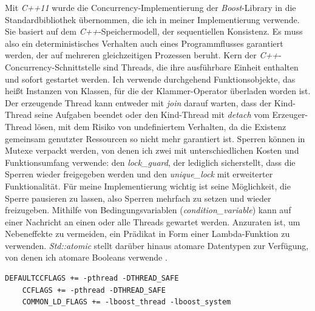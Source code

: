\documentclass[a4paper,12pt,twoside]{article}
\newcommand{\Fb}[1]{\textit{#1}} %
\begin{document}
Mit \Fb{C++11} wurde die Concurrency-Implementierung der \Fb{Boost}-Library in die Standardbibliothek übernommen, die ich in meiner Implementierung verwende. Sie basiert auf dem \Fb{C++}-Speichermodell, der sequentiellen Konsistenz. Es muss also ein deterministisches Verhalten auch eines Programmflusses garantiert werden, der auf mehreren gleichzeitigen Prozessen beruht. Kern der \Fb{C++}-Concurrency-Schnittstelle sind Threads, die ihre ausführbare Einheit enthalten und sofort gestartet werden. Ich verwende durchgehend Funktionsobjekte, das heißt Instanzen von Klassen, für die der Klammer-Operator überladen worden ist. Der erzeugende Thread kann entweder mit \Fb{join} darauf warten, dass der Kind-Thread seine Aufgaben beendet oder den Kind-Thread mit \Fb{detach} vom Erzeuger-Thread lösen, mit dem Risiko von undefiniertem Verhalten, da die Existenz gemeinsam genutzter Ressourcen so nicht mehr garantiert ist. Sperren können in Mutexe verpackt werden, von denen ich zwei mit unterschiedlichen Kosten und Funktionsumfang verwende: den \Fb{lock\_guard}, der lediglich sicherstellt, dass die Sperren wieder freigegeben werden und den \Fb{unique\_lock} mit erweiterter Funktionalität. Für meine Implementierung wichtig ist seine Möglichkeit, die Sperre pausieren zu lassen, also Sperren mehrfach zu setzen und wieder freizugeben. Mithilfe von Bedingungsvariablen (\Fb{condition\_variable}) kann auf einer Nachricht an einen oder alle Threads gewartet werden. Anzuraten ist, um Nebeneffekte zu vermeiden, ein Prädikat in Form einer Lambda-Funktion zu verwenden. \Fb{Std::atomic} stellt darüber hinaus atomare Datentypen zur Verfügung, von denen ich atomare Booleans verwende \parencite{Grimm2018}. 

\begin{minipage}{0.95\textwidth}
	\begin{lstlisting}[caption={Flags der \Fb{MThreaded}-Algebra.}, label=list:flags]
	DEFAULTCCFLAGS += -pthread -DTHREAD_SAFE
	CCFLAGS += -pthread -DTHREAD_SAFE
	COMMON_LD_FLAGS += -lboost_thread -lboost_system
	\end{lstlisting}
\end{minipage}
\end{document}
